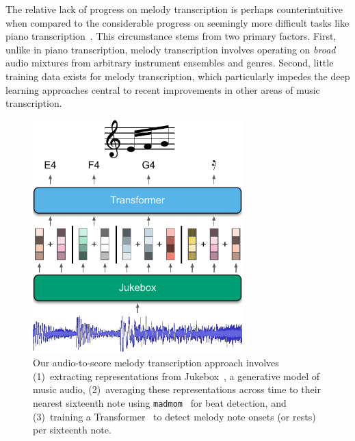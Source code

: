 \documentclass{article}
\newcommand{\madmom}{\texttt{madmom}}
\begin{document}
The relative lack of progress on melody transcription is perhaps counterintuitive when compared to the considerable progress on seemingly more difficult tasks like piano transcription~\cite{sigtia2016end,hawthorne2017onsets}.
This circumstance stems from two primary factors. 
First, unlike in piano transcription, melody transcription involves operating on \emph{broad} audio mixtures from arbitrary instrument ensembles and genres. 
Second, little training data exists for melody transcription, which particularly impedes the deep learning approaches central to recent improvements in other areas of music transcription. 

\begin{figure}
    \centering
    \includegraphics[width=8.1cm]{figs/fig1.pdf}
    \caption{
Our audio-to-score melody transcription approach involves 
(1)~extracting representations from Jukebox~\cite{dhariwal2020jukebox}, a generative model of music audio, 
(2)~averaging these representations across time to their nearest sixteenth note using \madmom~\cite{bock2016madmom,bock2016joint} for beat detection,
and
(3)~training a Transformer~\cite{vaswani2017attention} to detect melody note onsets (or rests) per sixteenth note.
}
 \label{fig:fig1}
\end{figure}
\end{document}
